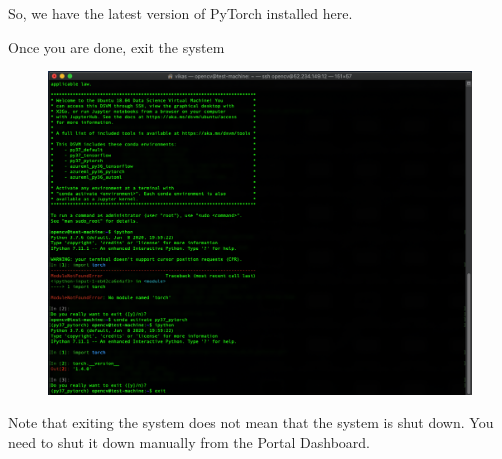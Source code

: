 So, we have the latest version of PyTorch installed here.

Once you are done, exit the system

\begin{figure}[H]
\begin{center} 
\includegraphics[scale=0.30]{figures/ssh13}
\end{center}
\end{figure}

Note that exiting the system does not mean that the system is shut down. You need to shut it down manually from the Portal Dashboard.